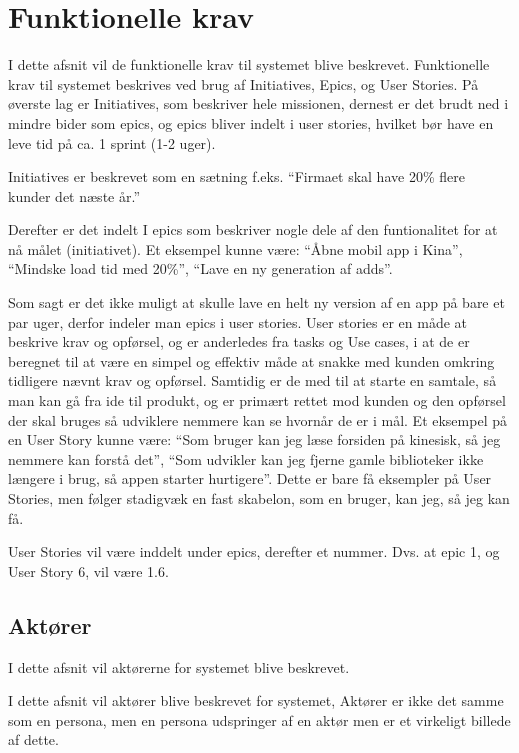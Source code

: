 
\chapter{Funktionelle krav}

I dette afsnit vil de funktionelle krav til systemet blive beskrevet. Funktionelle krav til systemet beskrives ved brug af Initiatives, Epics, og User Stories. På øverste lag er Initiatives, som beskriver hele missionen, dernest er det brudt ned i mindre bider som epics, og epics bliver indelt i user stories, hvilket bør have en leve tid på ca. 1 sprint (1-2 uger).

Initiatives er beskrevet som en sætning f.eks.  ``Firmaet skal have 20\% flere kunder det næste år.''

Derefter er det indelt I epics som beskriver nogle dele af den funtionalitet for at nå målet (initiativet). Et eksempel kunne være: ``Åbne mobil app i Kina'', ``Mindske load tid med 20\%'', ``Lave en ny generation af adds''.

Som sagt er det ikke muligt at skulle lave en helt ny version af en app på bare et par uger, derfor indeler man epics i user stories. User stories er en måde at beskrive krav og opførsel, og er anderledes fra tasks og Use cases, i at de er beregnet til at være en simpel og effektiv måde at snakke med kunden omkring tidligere nævnt krav og opførsel. Samtidig er de med til at starte en samtale, så man kan gå fra ide til produkt, og er primært rettet mod kunden og den opførsel der skal bruges så udviklere nemmere kan se hvornår de er i mål. Et eksempel på en User Story kunne være: ``Som bruger kan jeg læse forsiden på kinesisk, så jeg nemmere kan forstå det'', ``Som udvikler kan jeg fjerne gamle biblioteker ikke længere i brug, så appen starter hurtigere''. Dette er bare få eksempler på User Stories, men følger stadigvæk en fast skabelon, som en bruger, kan jeg, så jeg kan få.

User Stories vil være inddelt under epics, derefter et nummer. Dvs. at epic 1, og User Story 6, vil være 1.6.

\section{Aktører}

I dette afsnit vil aktørerne for systemet blive beskrevet.

I dette afsnit vil aktører blive beskrevet for systemet, Aktører er ikke det samme som en persona, men en persona udspringer af en aktør men er et virkeligt billede af dette.

